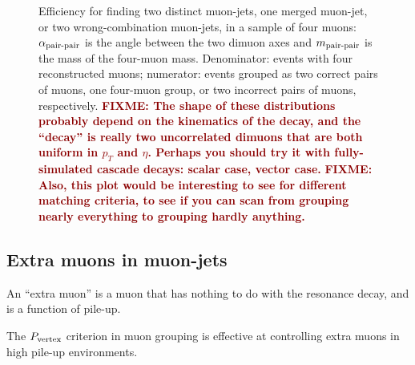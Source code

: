 \documentclass[12pt]{article}
\newcommand{\fixme}[1]{\textcolor{darkred}{\bf FIXME: #1}}
\newcommand{\s}[1]{{\mbox{\scriptsize #1}}}
\begin{document}
\begin{figure}
\caption{Efficiency for finding two distinct muon-jets, one merged
  muon-jet, or two wrong-combination muon-jets, in a sample of four
  muons: $\alpha_\s{pair-pair}$ is the angle between the two dimuon
  axes and $m_\s{pair-pair}$ is the mass of the four-muon mass.
  Denominator: events with four reconstructed muons; numerator: events
  grouped as two correct pairs of muons, one four-muon group, or two
  incorrect pairs of muons, respectively. \fixme{The shape of these
    distributions probably depend on the kinematics of the decay, and
    the ``decay'' is really two uncorrelated dimuons that are both
    uniform in $p_T$ and $\eta$.  Perhaps you should try it with
    fully-simulated cascade decays: scalar case, vector case.}
  \fixme{Also, this plot would be interesting to see for different
    matching criteria, to see if you can scan from grouping nearly
    everything to grouping hardly
    anything.} \label{fig:foundGroupByMassAndVertexProbOrDeltaR}}
\end{figure}

\subsection{Extra muons in muon-jets}

An ``extra muon'' is a muon that has nothing to do with the resonance
decay, and is a function of pile-up.

The $P_\s{vertex}$ criterion in muon grouping is effective at
controlling extra muons in high pile-up environments.
\end{document}
